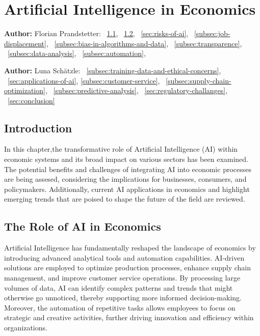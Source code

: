 \chapter{Artificial Intelligence in Economics}
\label{chap:Artificial_Intelligence_in_Economics}
\textbf{Author:} Florian Prandstetter: ~\ref{sec:introduction}, ~\ref{sec:role-of-ai-in-economics}, ~\ref{sec:risks-of-ai}, ~\ref{subsec:job-displacement}, ~\ref{subsec:bias-in-algorithms-and-data}, ~\ref{subsec:transparence}, ~\ref{subsec:data-analysis}, ~\ref{subsec:automation}, 

\textbf{Author:} Luna Schätzle: ~\ref{subsec:training-data-and-ethical-concerns}, ~\ref{sec:applications-of-ai}, \ref{subsec:customer-service}, ~\ref{subsec:supply-chain-optimization}, ~\ref{subsec:predictive-analysis}, ~\ref{sec:regulatory-challanges}, ~\ref{sec:conclusion}


\section{Introduction}
\label{sec:introduction}

In this chapter,the transformative role of Artificial Intelligence (AI) within economic systems and its broad impact on various sectors has been examined. The potential benefits and challenges of integrating AI into economic processes are being assesed, considering the implications for businesses, consumers, and policymakers. Additionally, current AI applications in economics and highlight emerging trends that are poised to shape the future of the field are reviewed.

\section{The Role of AI in Economics}
\label{sec:role-of-ai-in-economics}

Artificial Intelligence has fundamentally reshaped the landscape of economics by introducing advanced analytical tools and automation capabilities. AI-driven solutions are employed to optimize production processes, enhance supply chain management, and improve customer service operations. By processing large volumes of data, AI can identify complex patterns and trends that might otherwise go unnoticed, thereby supporting more informed decision-making. Moreover, the automation of repetitive tasks allows employees to focus on strategic and creative activities, further driving innovation and efficiency within organizations.

